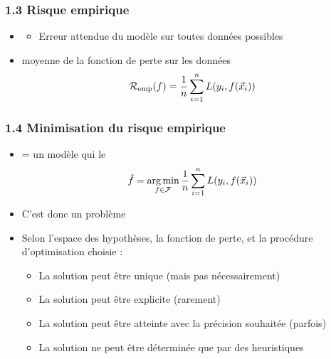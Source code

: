 \begin{frame}
  \frametitle{1.3 Risque empirique}
  \begin{itemize}
  \item {}
    \begin{itemize}
    \item Erreur attendue du modèle sur toutes données possibles 
    \end{itemize}
  \item {} moyenne de la fonction de perte sur les
    données
    \[\mathcal{R}_{\text{emp}}(f) = \frac1n \sum_{i=1}^n L(y_i, f(\vec{x}_i)) \]
  \end{itemize}
\end{frame}


\begin{frame}
  \frametitle{1.4 Minimisation du risque empirique}
  \begin{itemize}
  \item {} =  un modèle  qui  le 
    \[ \hat{f} = \operatorname*{arg\,min}_{f \in \mathcal{F}} \frac1n \sum_{i=1}^n L(y_i, f(\vec{x}_i)) \]
  \item C'est donc un problème 
  \item Selon l'espace des hypothèses, la fonction de perte, et la procédure
    d'optimisation choisie :
    \begin{itemize}
    \item La solution peut être unique (mais pas nécessairement)
    \item La solution peut être explicite (rarement)
    \item La solution peut être atteinte avec la précision souhaitée (parfois)
    \item La solution ne peut être déterminée que par des heuristiques 
    \end{itemize}
  \end{itemize}
\end{frame}

